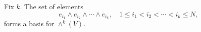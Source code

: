 
Fix $k$. The set of elements
$$e_{i_1} \wedge e_{i_2} \wedge \cdots \wedge e_{i_k}, \quad 1 \leq i_1 < i_2 < \cdots < i_k \leq N,$$
forms a basis for $\wedge^k(V)$.
